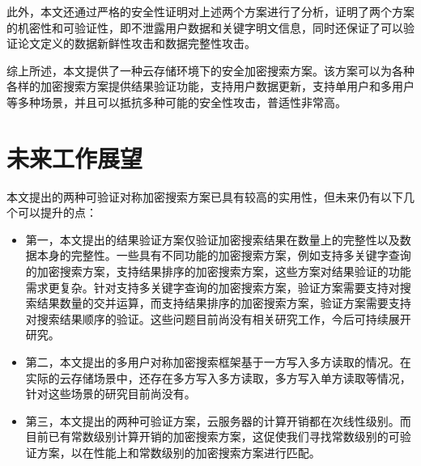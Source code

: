 此外，本文还通过严格的安全性证明对上述两个方案进行了分析，证明了两个方案的机密性和可验证性，即不泄露用户数据和关键字明文信息，同时还保证了可以验证论文定义的数据新鲜性攻击和数据完整性攻击。

综上所述，本文提供了一种云存储环境下的安全加密搜索方案。该方案可以为各种各样的加密搜索方案提供结果验证功能，支持用户数据更新，支持单用户和多用户等多种场景，并且可以抵抗多种可能的安全性攻击，普适性非常高。

\section{未来工作展望}
本文提出的两种可验证对称加密搜索方案已具有较高的实用性，但未来仍有以下几个可以提升的点：
\begin{itemize}
  \item 第一，本文提出的结果验证方案仅验证加密搜索结果在数量上的完整性以及数据本身的完整性。一些具有不同功能的加密搜索方案，例如支持多关键字查询的加密搜索方案，支持结果排序的加密搜索方案，这些方案对结果验证的功能需求更复杂。针对支持多关键字查询的加密搜索方案，验证方案需要支持对搜索结果数量的交并运算，而支持结果排序的加密搜索方案，验证方案需要支持对搜索结果顺序的验证。这些问题目前尚没有相关研究工作，今后可持续展开研究。
  \item 第二，本文提出的多用户对称加密搜索框架\multi 基于一方写入多方读取的情况。在实际的云存储场景中，还存在多方写入多方读取，多方写入单方读取等情况，针对这些场景的研究目前尚没有。
  \item 第三，本文提出的两种可验证方案，云服务器的计算开销都在次线性级别。而目前已有常数级别计算开销的加密搜索方案，这促使我们寻找常数级别的可验证方案，以在性能上和常数级别的加密搜索方案进行匹配。
\end{itemize}

